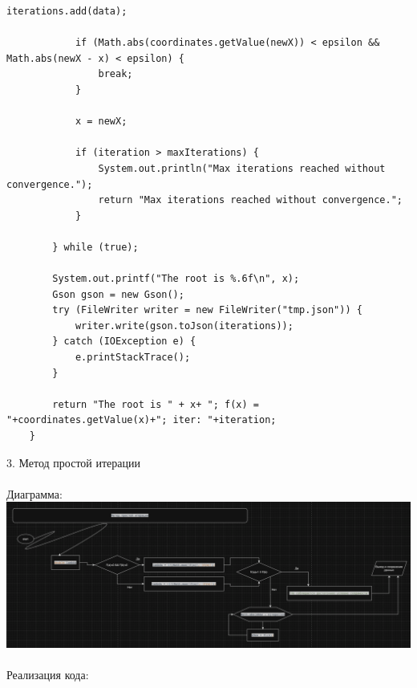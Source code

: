 \documentclass{article}
\begin{document}
\begin{lstlisting}[frame=single, basicstyle=\ttfamily, breaklines=true, breakatwhitespace=true, postbreak=\mbox{\textcolor{red}{$\hookrightarrow$}\space}]
            iterations.add(data);

            if (Math.abs(coordinates.getValue(newX)) < epsilon && Math.abs(newX - x) < epsilon) {
                break;
            }

            x = newX;

            if (iteration > maxIterations) {
                System.out.println("Max iterations reached without convergence.");
                return "Max iterations reached without convergence.";
            }

        } while (true);

        System.out.printf("The root is %.6f\n", x);
        Gson gson = new Gson();
        try (FileWriter writer = new FileWriter("tmp.json")) {
            writer.write(gson.toJson(iterations));
        } catch (IOException e) {
            e.printStackTrace();
        }

        return "The root is " + x+ "; f(x) = "+coordinates.getValue(x)+"; iter: "+iteration;
    }
\end{lstlisting}
3. Метод простой итерации
\\ \\
Диаграмма:\\
\includegraphics[width=.7\textwidth]{simple.png}
\\ \\
Реализация кода:
\\ \\
\end{document}
